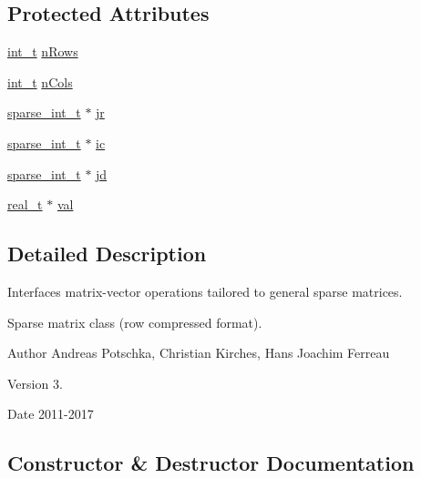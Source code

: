 \subsection*{Protected Attributes}
\begin{DoxyCompactItemize}
\item 
\hyperlink{_types_8hpp_ab6fd6105e64ed14a0c9281326f05e623}{int\+\_\+t} \hyperlink{class_sparse_matrix_row_af443a2e2deccc57576c1cb3ad64a8755}{n\+Rows}
\item 
\hyperlink{_types_8hpp_ab6fd6105e64ed14a0c9281326f05e623}{int\+\_\+t} \hyperlink{class_sparse_matrix_row_a7918a50ad51b4d9adadcbfcd64ea5a91}{n\+Cols}
\item 
\hyperlink{_types_8hpp_aa5432b00c9081e2d62d7f38c32e4ed80}{sparse\+\_\+int\+\_\+t} $\ast$ \hyperlink{class_sparse_matrix_row_a899e34180345977c83769223b3152bcc}{jr}
\item 
\hyperlink{_types_8hpp_aa5432b00c9081e2d62d7f38c32e4ed80}{sparse\+\_\+int\+\_\+t} $\ast$ \hyperlink{class_sparse_matrix_row_a46dd9b0b5138ecd2deb37415d170c6b5}{ic}
\item 
\hyperlink{_types_8hpp_aa5432b00c9081e2d62d7f38c32e4ed80}{sparse\+\_\+int\+\_\+t} $\ast$ \hyperlink{class_sparse_matrix_row_a8d71f4ae6afa7bd4ac153f9b11019a7a}{jd}
\item 
\hyperlink{qp_o_a_s_e_s__wrapper_8h_a0d00e2b3dfadee81331bbb39068570c4}{real\+\_\+t} $\ast$ \hyperlink{class_sparse_matrix_row_a2cec7a8738e87414eaf6ebdf1056b3ab}{val}
\end{DoxyCompactItemize}


\subsection{Detailed Description}
Interfaces matrix-\/vector operations tailored to general sparse matrices. 

Sparse matrix class (row compressed format).

\begin{DoxyAuthor}{Author}
Andreas Potschka, Christian Kirches, Hans Joachim Ferreau 
\end{DoxyAuthor}
\begin{DoxyVersion}{Version}
3. 
\end{DoxyVersion}
\begin{DoxyDate}{Date}
2011-\/2017 
\end{DoxyDate}


\subsection{Constructor \& Destructor Documentation}
\mbox{\label{class_sparse_matrix_row_ad61dd7c9a0b5f00126f2c17cb325bfa4}} 
